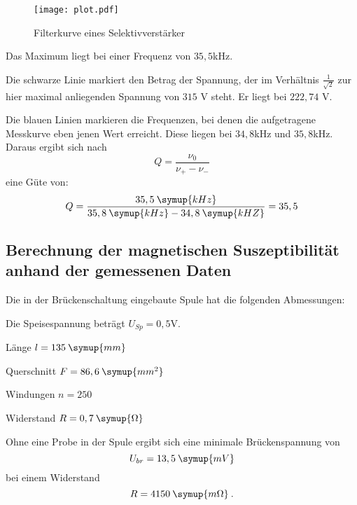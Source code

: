 \begin{figure}[H]
  \centering
  \texttt{[image: plot.pdf]}
  \caption{Filterkurve eines Selektivverstärker}
  \label{fig:plot}
\end{figure}

Das Maximum liegt bei einer Frequenz von $35,5$kHz.

Die schwarze Linie markiert den Betrag der Spannung, der im Verhältnis $\frac{1}{\sqrt{2}}$ zur hier
maximal anliegenden Spannung von $315$ V steht. Er liegt bei $222,74$ V.

Die blauen Linien markieren die Frequenzen, bei denen die aufgetragene Messkurve eben jenen Wert
erreicht. Diese liegen bei $34,8$kHz und $35,8$kHz.
Daraus ergibt sich nach
\begin{equation*}
  Q = \frac{\nu_0}{\nu_+ - \nu_-}
\end{equation*}
eine Güte von:
\begin{equation*}
  Q = \frac{35,5\:\symup{kHz}}{35,8\:\symup{kHz} - 34,8\:\symup{kHZ}} = 35,5
\end{equation*}



\subsection{Berechnung der magnetischen Suszeptibilität anhand der gemessenen Daten}
Die in der Brückenschaltung eingebaute Spule hat die folgenden Abmessungen:

Die Speisespannung beträgt $U_{Sp} = 0,5$V.

Länge $l = 135 \: \symup{mm}$

Querschnitt $F = 86,6 \: \symup{mm^2}$

Windungen $n = 250$

Widerstand $R = 0,7 \: \symup{\Omega}$

Ohne eine Probe in der Spule ergibt sich eine minimale Brückenspannung von
\begin{equation*}
  U_{br} = 13,5 \: \symup{mV}
\end{equation*}
bei einem Widerstand
\begin{equation*}
  R = 4150 \: \symup{m\Omega} \: .
\end{equation*}


